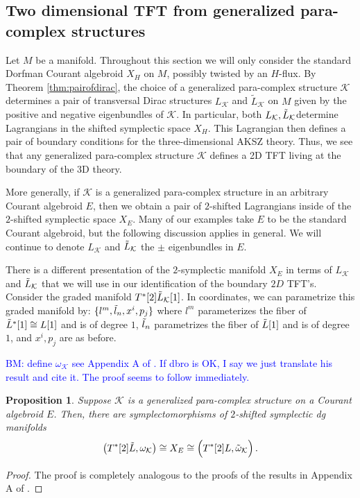 \documentclass[letterpaper,12pt]{article}
\newcommand{\TT}{{T\oplus T^*}}
\newcommand{\KK}{\mathcal{K}}
\newtheorem{proposition}[theorem]{Proposition}
\theoremstyle{definition}
\theoremstyle{remark}
\theoremstyle{examples}
\def\brian{\textcolor{blue}{BM: }\textcolor{blue}}
\begin{document}
\subsection{Two dimensional TFT from generalized para-complex structures}

Let $M$ be a manifold.
Throughout this section we will only consider the standard Dorfman Courant algebroid $X_H$ on $M$, possibly twisted by an $H$-flux.
By Theorem \ref{thm:pairofdirac}, the choice of a generalized para-complex structure $\KK$ determines a pair of transversal Dirac structures $L_{\KK}$ and $\tilde{L}_{\KK}$ on $M$ given by the positive and negative eigenbundles of $\KK$. 
In particular, both $L_{\KK}, \Tilde{L}_{\KK}$determine Lagrangians in the shifted symplectic space $X_{H}$. 
This Lagrangian then defines a pair of boundary conditions for the three-dimensional AKSZ theory.
Thus, we see that any generalized para-complex structure $\KK$ defines a 2D TFT living at the boundary of the 3D theory. 

More generally, if $\KK$ is a generalized para-complex structure in an arbitrary Courant algebroid $E$, then we obtain a pair of $2$-shifted Lagrangians inside of the $2$-shifted symplectic space $X_E$. 
Many of our examples take $E$ to be the standard Courant algebroid, but the following discussion applies in general. 
We will continue to denote $L_{\KK}$ and $\Tilde{L}_{\KK}$ the $\pm$ eigenbundles in $E$. 

There is a different presentation of the $2$-symplectic manifold $X_E$ in terms of $L_{\KK}$ and $\Tilde{L}_{\KK}$ that we will use in our identification of the boundary $2D$ TFT's. 
Consider the graded manifold $T^*[2] \Tilde{L}_{\KK} [1]$.
In coordinates, we can parametrize this graded manifold by: $\{l^m, \Tilde{l}_n, x^i, p_j\}$ where $l^m$ parameterizes the fiber of $\Tilde{L}^*[1] \cong L [1]$ and is of degree $1$, $\Tilde{l}_n$ parametrizes the fiber of $\Tilde{L}[1]$ and is of degree $1$, and $x^i, p_j$ are as before.

\brian{define $\omega_{\KK}$ see Appendix A of \cite{Cattaneo:2009zx}. 
If dbro is OK, I say we just translate his result and cite it. The proof seems to follow immediately.}
\begin{proposition}\label{prop: symp}
Suppose $\KK$ is a generalized para-complex structure on a Courant algebroid $E$.
Then, there are symplectomorphisms of $2$-shifted symplectic dg manifolds
\[
\left(T^*[2] \Tilde{L}, \omega_{\KK} \right) \cong X_E \cong \left(T^*[2] \overset{\;}{L}, \Tilde{\omega}_{\KK} \right) .
\]
\end{proposition}
\begin{proof}
The proof is completely analogous to the proofs of the results in Appendix A of \cite{Cattaneo:2009zx}.
\end{proof}
\end{document}
